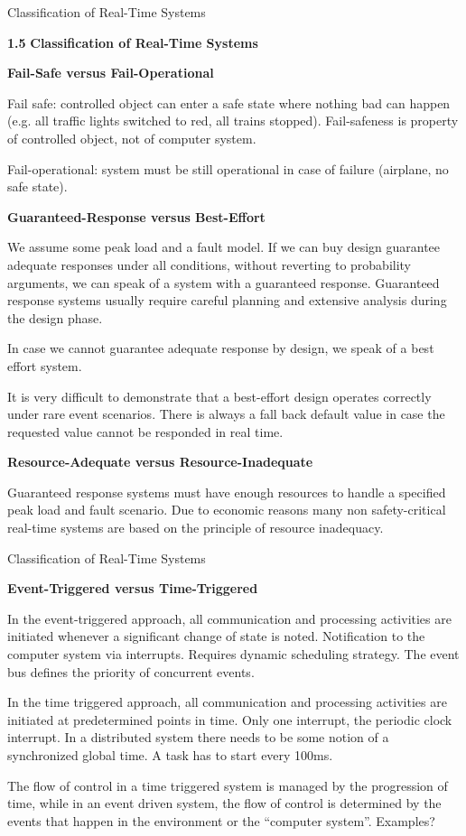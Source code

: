 \begin{frame}{Classification of Real-Time Systems}

\textbf{1.5} \protect\hypertarget{teil6}{}{}\textbf{Classification of Real-Time Systems}

\textbf{Fail-Safe versus Fail-Operational}

Fail safe: controlled object can enter a safe state where nothing bad
can happen (e.g. all traffic lights switched to red, all trains
stopped). Fail-safeness is property of controlled object, not of
computer system.

Fail-operational: system must be still operational in case of failure
(airplane, no safe state).

\textbf{Guaranteed-Response versus Best-Effort}

We assume some peak load and a fault model. If we can buy design
guarantee adequate responses under all conditions, without reverting to
probability arguments, we can speak of a system with a guaranteed
response. Guaranteed response systems usually require careful planning
and extensive analysis during the design phase.

In case we cannot guarantee adequate response by design, we speak of a
best effort system.

It is very difficult to demonstrate that a best-effort design operates
correctly under rare event scenarios. There is always a fall back
default value in case the requested value cannot be responded in real
time.

\textbf{Resource-Adequate versus Resource-Inadequate}

Guaranteed response systems must have enough resources to handle a
specified peak load and fault scenario. Due to economic reasons many non
safety-critical real-time systems are based on the principle of resource
inadequacy.

\end{frame}

\begin{frame}{Classification of Real-Time Systems}

\textbf{Event-Triggered versus Time-Triggered}

In the event-triggered approach, all communication and processing
activities are initiated whenever a significant change of state is
noted. Notification to the computer system via interrupts. Requires
dynamic scheduling strategy. The event bus defines the priority of
concurrent events.

In the time triggered approach, all communication and processing
activities are initiated at predetermined points in time. Only one
interrupt, the periodic clock interrupt. In a distributed system there
needs to be some notion of a synchronized global time. A task has to
start every 100ms.

The flow of control in a time triggered system is managed by the
progression of time, while in an event driven system, the flow of
control is determined by the events that happen in the environment or
the ``computer system''. Examples?

\end{frame}

